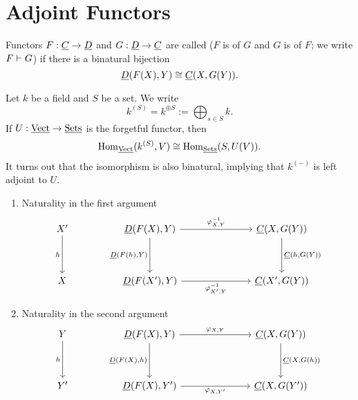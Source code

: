 
\section{Adjoint Functors}

\begin{definition*}
	Functors \( F: \underline{C} \to \underline{D} \) and \( G: \underline{D} \to \underline{C} \) are called  (\( F \) is  of \( G \) and \( G \) is  of \( F \); we write \( F \mathrel{\vdash} G \)) if there is a binatural bijection
	\[
		\underline{D}(F(X), Y) \cong \underline{C}(X, G(Y)).
	\]
\end{definition*}


Let \( k \) be a field and \( S \) be a set. We write
\[
	k^{(S)} = k^{\oplus S} := \bigoplus_{s \in S} k.
\]
If \( U: \underline{\mathrm{Vect}} \to \underline{\mathrm{Sets}} \) is the forgetful functor, then
\[
	\operatorname{Hom}_{\underline{\mathrm{Vect}}}(k^{(S)}, V) \cong \operatorname{Hom}_{\underline{\mathrm{Sets}}}(S, U(V)).
\]
It turns out that the isomorphism is also binatural, implying that \( k^{(-)} \) is left adjoint to \( U \).


\begin{enumerate}
	\item Naturality in the first argument
		\[
			\begin{tikzcd}{X'} && {\ct{D}(F(X), Y)} &&& {\C(X, G(Y))} \\
				\\
				X && {\ct{D}(F(X'), Y)} &&& {\C(X', G(Y))}
				\arrow["h"', from=1-1, to=3-1]
				\arrow["{\varphi^{-1}_{X, Y}}", from=1-3, to=1-6]
				\arrow["{\ct{D}(F(h), Y)}"', from=1-3, to=3-3]
				\arrow["{\C(h, G(Y))}", from=1-6, to=3-6]
				\arrow["{\varphi^{-1}_{X', Y}}"', from=3-3, to=3-6]
			\end{tikzcd}
		\]
	\item Naturality in the second argument
		\[
			\begin{tikzcd}
				Y && {\ct{D}(F(X), Y)} &&& {\C(X, G(Y))} \\
				\\
				{Y'} && {\ct{D}(F(X), Y')} &&& {\C(X, G(Y'))}
				\arrow["h"', from=1-1, to=3-1]
				\arrow["{\varphi_{X, Y}}", from=1-3, to=1-6]
				\arrow["{\ct{D}(F(X), h)}"', from=1-3, to=3-3]
				\arrow["{\C(X, G(h))}", from=1-6, to=3-6]
				\arrow["{\varphi_{X, Y'}}"', from=3-3, to=3-6]
			\end{tikzcd}
		\]
\end{enumerate}

